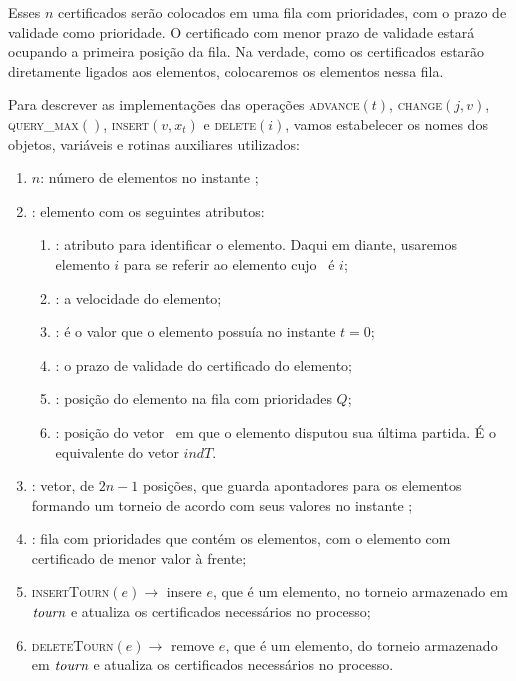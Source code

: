 Esses $n$ certificados serão colocados em uma fila com prioridades, com o prazo de validade como
prioridade.
O certificado com menor prazo de validade estará ocupando a primeira posição da fila.
Na verdade, como os certificados estarão diretamente ligados aos elementos, colocaremos os
elementos nessa fila.

Para descrever as implementações das operações \textsc{advance}$(t)$, \textsc{change}$(j, v)$,
\textsc{query\_max}$()$, \textsc{insert}$(v, x_t)$ e \textsc{delete}$(i)$, vamos estabelecer os
nomes dos objetos, variáveis e rotinas auxiliares utilizados:
\begin{enumerate}
    \item $n$: número de elementos no instante \now;
    \item \elemento: elemento com os seguintes atributos:
    \begin{enumerate}
        \item \id: atributo para identificar o elemento.
        Daqui em diante, usaremos elemento $i$ para se referir ao elemento
        cujo \id~é $i$;

        \item \speed: a velocidade do elemento;

        \item \initv: é o valor que o elemento possuía no
        instante $t = 0$;

        \item \cert: o prazo de validade do certificado do
        elemento;

        \item \pqpos: posição do elemento
        na fila com prioridades $Q$;

        \item \lastmatch: posição do
        vetor \torneio~em que o elemento disputou sua última
        partida.
        É o equivalente do vetor $\textit{indT}$.
    \end{enumerate}
    \item \torneio: vetor, de $2n - 1$ posições, que guarda
    apontadores para os elementos formando um torneio de acordo com
    seus valores no instante \now;

    \item \Q: fila com prioridades que contém os elementos, com o
    elemento com certificado de menor valor à frente;

    \item \textsc{insertTourn}$(e) \rightarrow$ insere $e$, que é um
    elemento, no torneio armazenado em $\textit{tourn}$ e atualiza os certificados necessários no
    processo;

    \item \textsc{deleteTourn}$(e) \rightarrow$ remove $e$, que é um
    elemento, do torneio armazenado em $\textit{tourn}$ e atualiza os certificados necessários no
    processo.
\end{enumerate}
